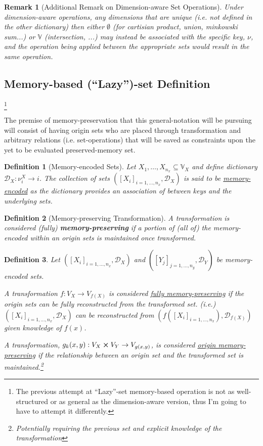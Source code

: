 \documentclass[11pt]{article}
\newtheorem{definition}{Definition}
\newtheorem{remark}{Remark}
\newcommand{\V}{\mathbb{V}} %
\newcommand{\Key}{\nu} %
\newcommand{\Dict}{\mathcal{D}} %
\begin{document}
\begin{remark}[Additional Remark on Dimension-aware Set Operations]
	Under dimension-aware operations, any dimensions that are unique (i.e. not defined in the other dictionary) then either $\emptyset$ (for cartisian product, union, minkowski sum...) or $\V$ (intersection, ...) may instead be associated with the specific key, $\Key$, and the operation being applied between the appropriate sets would result in the same operation.
\end{remark}


\subsection{Memory-based (``Lazy'')-set Definition}
\footnote{The previous attempt at ``Lazy''-set memory-based operation is not as well-structured or as general as the dimension-aware version, thus I'm going to have to attempt it differently.}

The premise of memory-preservation that this general-notation will be pursuing will consist of having origin sets who are placed through transformation and arbitrary relations (i.e. set-operations) that will be saved as constraints upon the yet to be evaluated preserved-memory set.


\begin{definition}[Memory-encoded Sets]
	Let $X_{1},\dots,X_{n_x} \subseteq \V_{X}$ and define dictionary $\Dict_{X} : \Key^{X}_{i} \to i$.
	The collection of sets $([X_{i}]_{i=1,\dots,n_x},\Dict_{X})$ is said to be \underline{\emph{memory-encoded}} as the dictionary provides an association of between keys and the underlying sets.
\end{definition}

\begin{definition}[Memory-preserving Transformation]
	A transformation is considered (fully) \textbf{\emph{memory-preserving}} if a portion of (all of) the memory-encoded within an origin sets is maintained once transformed.
\end{definition}



\begin{definition}
	Let $([X_{i}]_{i=1,\dots,n_x},\Dict_{X})$ and $([Y_{j}]_{j=1,\dots,n_y},\Dict_{Y})$ be memory-encoded sets.
		
	A transformation $f : V_{X} \to V_{f(X)}$ is considered \underline{\emph{fully memory-preserving}} if the origin sets can be fully reconstructed from the transformed set. 
	(i.e.) 
	$([X_{i}]_{i=1,\dots,n_x},\Dict_{X})$ can be reconstructed from $(f([X_{i}]_{i=1,\dots,n_x}),\Dict_{f(X)})$ given knowledge of $f(x)$.	

	A transformation, $g_{k}(x,y) : V_{X} \cross V_{Y} \to V_{g(x,y)}$, is considered \underline{\emph{origin memory-preserving}} if the relationship between an origin set and the transformed set is maintained.\footnote{Potentially requiring the previous set and explicit knowledge of the transformation}
\end{definition}
\end{document}
